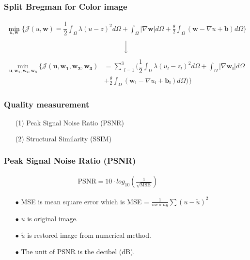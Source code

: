 \documentclass[xcolor=dvipsnames, xetex,serif]{beamer}
\begin{document}
    \begin{frame}
    \frametitle{Split Bregman for Color image}
        \begin{align*}
        \min_{u,\boldsymbol{w}} \{ \mathcal{J}(u,\boldsymbol{w}) = \dfrac{1}{2} \int_{\Omega} \lambda(u-z)^2 d\Omega +  \int_{\Omega}  |\nabla \boldsymbol{w}|  d\Omega + \frac{\theta}{2} \int_{\Omega} (\boldsymbol{w} - \nabla u + \boldsymbol{b}) d\Omega \}
        \end{align*}
        \begin{align*}
        \Big \downarrow
        \end{align*}
        \begin{align*}
        \min_{\boldsymbol{u},\boldsymbol{w_1},\boldsymbol{w_2},\boldsymbol{w_3}} \{ \mathcal{J}(\boldsymbol{u},\boldsymbol{w_1},\boldsymbol{w_2},\boldsymbol{w_3}) &= \underset{l=1}{\overset{3}{\sum}} (  \dfrac{1}{2} \int_{\Omega} \lambda(u_l-z_l)^2 d\Omega +  \int_{\Omega}  |\nabla \boldsymbol{w_l}|  d\Omega \\ &+ \frac{\theta}{2} \int_{\Omega} (\boldsymbol{w_l} - \nabla u_l+ \boldsymbol{b_l}) d\Omega ) \}
        \end{align*}
    \end{frame}
    \begin{frame}
        \frametitle{Quality measurement}
        \begin{itemize}
            \item[(1)] Peak Signal Noise Ratio (PSNR)
            \item[(2)] Structural Similarity (SSIM)
        \end{itemize}
    \end{frame}
    \begin{frame}
        \frametitle{Peak Signal Noise Ratio (PSNR)}
        \begin{align*}
        \text{PSNR}  = 10 \cdot log_{10} ( \frac{1}{\sqrt{\text{MSE}}} )  \hspace{1cm}
        \end{align*}
        \begin{itemize}
            \item[$\bullet$] MSE is mean square error which is MSE = $\frac{1}{nx \times ny} \sum (u - \tilde{u})^2 $
            \item[$\bullet$] $u$ is original image.
            \item[$\bullet$] $\tilde{u}$  is restored image from numerical method.
            \item[$\bullet$] The unit of PSNR is the decibel (dB).
        \end{itemize}
    \end{frame}
\end{document}
